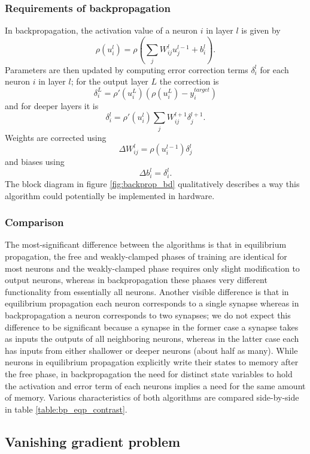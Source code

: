 \documentclass[utf8]{frontiersSCNS}
\begin{document}
\subsubsection{Requirements of backpropagation}

In backpropagation, the activation value of a neuron $i$ in layer $l$ is given by $$\rho(u_i^l)=\rho(\sum_jW_{ij}^lu_j^{l-1}+b_i^l).$$ Parameters are then updated by computing error correction terms $\delta_i^l$ for each neuron $i$ in layer $l$; for the output layer $L$ the correction is $$\delta_i^L=\rho'(u_i^L)(\rho(u_i^L)-y_i^{target})$$ and for deeper layers it is $$\delta_i^l=\rho'(u_i^l)\sum_jW_{ij}^{l+1}\delta_j^{l+1}.$$ Weights are corrected using $$\Delta W_{ij}^l=\rho(u_i^{l-1})\delta_j^l$$ and biases using $$\Delta b_i^l=\delta_i^l.$$ The block diagram in figure \ref{fig:backprop_bd} qualitatively describes a way this algorithm could potentially be implemented in hardware.

\subsubsection{Comparison}

The most-significant difference between the algorithms is that in equilibrium propagation, the free and weakly-clamped phases of training are identical for most neurons and the weakly-clamped phase requires only slight modification to output neurons, whereas in backpropagation these phases very different functionality from essentially all neurons. Another visible difference is that in equilibrium propagation each neuron corresponds to a single synapse whereas in backpropagation a neuron corresponds to two synapses; we do not expect this difference to be significant because a synapse in the former case a synapse takes as inputs the outputs of all neighboring neurons, whereas in the latter case each has inputs from either shallower or deeper neurons (about half as many). While neurons in equilibrium propagation explicitly write their states to memory after the free phase, in backpropagation the need for distinct state variables to hold the activation and error term of each neurons implies a need for the same amount of memory. Various characteristics of both algorithms are compared side-by-side in table \ref{table:bp_eqp_contrast}.

\subsection{Vanishing gradient problem}
\label{sec:vangrad}
\end{document}
